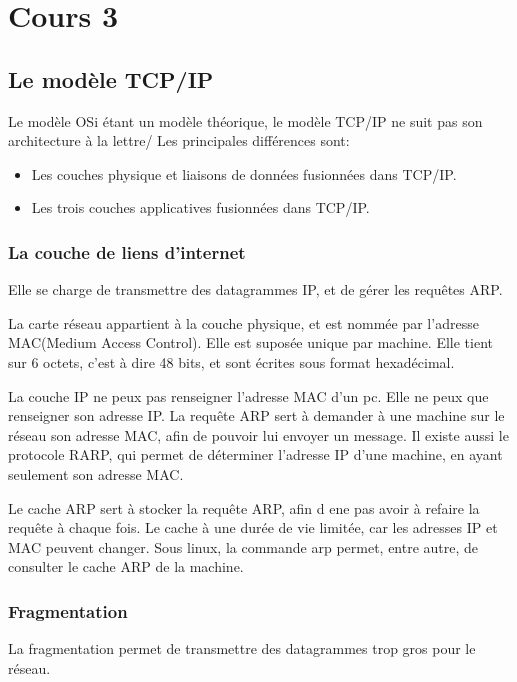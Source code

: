 \section{Cours 3}
\subsection{Le modèle TCP/IP}
Le modèle OSi étant un modèle théorique, le modèle TCP/IP ne suit pas son architecture à la lettre/
Les principales différences sont:
\begin{itemize}
	\item Les couches physique et liaisons de données fusionnées dans TCP/IP.
	\item Les trois couches applicatives fusionnées dans TCP/IP.
\end{itemize}
\subsubsection{La couche de liens d'internet}
Elle se charge de transmettre des datagrammes IP, et de gérer les requêtes ARP.

La carte réseau appartient à la couche physique, et est nommée par l'adresse MAC(Medium Access Control).
Elle est suposée unique par machine. Elle tient sur 6 octets, c'est à dire 48 bits, et sont écrites sous format
hexadécimal.

La couche IP ne peux pas renseigner l'adresse MAC d'un pc. Elle ne peux que renseigner son adresse IP.
La requête ARP sert à demander à une machine sur le réseau son adresse MAC, afin de pouvoir lui envoyer un message.
Il existe aussi le protocole RARP, qui permet de déterminer l'adresse IP d'une machine, en ayant seulement son
adresse MAC.

Le cache ARP sert à stocker la requête ARP, afin d ene pas avoir à refaire la requête à chaque fois.
Le cache à une durée de vie limitée, car les adresses IP et MAC peuvent changer.
Sous linux, la commande arp permet, entre autre, de consulter le cache ARP de la machine.

\subsubsection{Fragmentation}
La fragmentation permet de transmettre des datagrammes trop gros pour le réseau.
